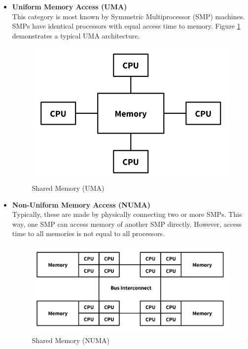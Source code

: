 \begin{itemize}
\item \textbf{Uniform Memory Access (UMA)}\\
  This category is most known by Symmetric Multiprocessor (SMP) machines. SMPs have identical processors with equal access time to memory. Figure \ref{fig:shared_memory_UMA} demonstrates a typical UMA architecture.\\

  \begin{figure}[ht]
    \centering
    \includegraphics[scale=0.4]{images/shared_mem.png}
    \caption{Shared Memory (UMA)}
    \label{fig:shared_memory_UMA}
  \end{figure}

\item \textbf{Non-Uniform Memory Access (NUMA)}\\
  Typically, these are made by physically connecting two or more SMPs. This way, one SMP can access memory of another SMP directly. However, access time to all memories is not equal to all processors.
  
  \begin{figure}[ht]
    \centering
    \includegraphics[scale=0.35]{images/numa.png}
    \caption{Shared Memory (NUMA)}
    \label{fig:shared_memory_NUMA}
  \end{figure}

\end{itemize}

